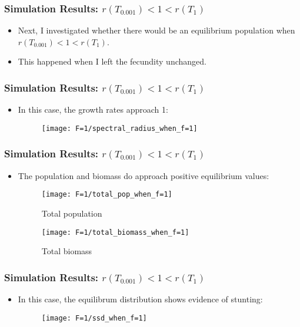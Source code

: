 \documentclass{beamer}
\begin{document}
\begin{frame}
	\frametitle{Simulation Results: $r(T_{0.001}) < 1 < r(T_1)$}
	\begin{itemize}
		\pause 
		\item Next, I investigated whether there would be an equilibrium population when $r(T_{0.001}) < 1 < r(T_1)$.
		\pause
		\item This happened when I left the fecundity unchanged.
	\end{itemize}
\end{frame}

\begin{frame}
	\frametitle{Simulation Results: $r(T_{0.001}) < 1 < r(T_1)$}
	\begin{itemize}
		\pause 
		\item In this case, the growth rates approach 1:
		
\begin{figure}
	\centering
	\texttt{[image: F=1/spectral\_radius\_when\_f=1]}
\end{figure}
	\end{itemize}
\end{frame}

\begin{frame}
	\frametitle{Simulation Results: $r(T_{0.001}) < 1 < r(T_1)$}
	\begin{itemize}
		\pause 
		\item The population and biomass do approach positive equilibrium values:
		\begin{figure}[H]
			\centering
			\begin{minipage}{.4\textwidth}
				\texttt{[image: F=1/total\_pop\_when\_f=1]}
				\caption{Total population}
			\end{minipage} \quad 
			\centering
			\begin{minipage}{.4\textwidth}
				\texttt{[image: F=1/total\_biomass\_when\_f=1]}
				\caption{Total biomass}
			\end{minipage}
		\end{figure}
	\end{itemize}
	\end{frame}

\begin{frame}
	\frametitle{Simulation Results: $r(T_{0.001}) < 1 < r(T_1)$}
	\begin{itemize}
		\pause 
		\item In this case, the equilibrum distribution shows evidence of stunting:
\begin{figure}
	\centering
	\texttt{[image: F=1/ssd\_when\_f=1]}
\end{figure}

	\end{itemize}
\end{frame}
\end{document}
